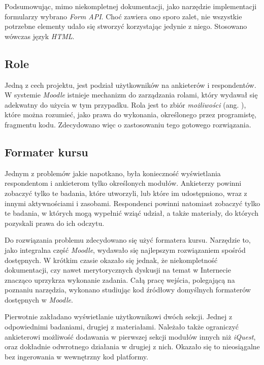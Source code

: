 Podsumowując, mimo niekompletnej dokumentacji, jako narzędzie implementacji formularzy wybrano \textit{Form API}. Choć zawiera ono sporo zalet, nie wszystkie potrzebne elementy udało się stworzyć korzystając jedynie z niego. Stosowano wówczas język \textit{HTML}. 

\subsection{Role}
\label{Chapter626}

Jedną z cech projektu, jest podział użytkowników na ankieterów i respondentów. W systemie \textit{Moodle} istnieje mechanizm do zarządzania rolami, który wydawał się adekwatny do użycia w tym przypadku. Rola jest to zbiór \textit{możliwości} (ang. ), które można rozumieć, jako prawa do wykonania, określonego przez programistę, fragmentu kodu. Zdecydowano więc o zastosowaniu tego gotowego rozwiązania.

\subsection{Formater kursu}
\label{Chapter627}

Jednym z problemów jakie napotkano, była konieczność wyświetlania respondentom i ankieterom tylko określonych modułów. Ankieterzy powinni zobaczyć tylko te badania, które utworzyli, lub które im udostępniono, wraz z innymi aktywnościami i zasobami. Respondenci powinni natomiast zobaczyć tylko te badania, w których mogą wypełnić wziąć udział, a także materiały, do których pozyskali prawa do ich odczytu.

Do rozwiązania problemu zdecydowano się użyć formatera kursu. Narzędzie to, jako integralna część \textit{Moodle}, wydawało się najlepszym rozwiązaniem spośród dostępnych. W krótkim czasie okazało się jednak, że niekompletność dokumentacji, czy nawet merytorycznych dyskusji na temat w Internecie znacząco uprzykrza wykonanie zadania. Całą pracę wejścia, polegającą na poznaniu narzędzia, wykonano studiując kod źródłowy domyślnych formaterów dostępnych w \textit{Moodle}.

Pierwotnie zakładano wyświetlanie użytkownikowi dwóch sekcji. Jednej z odpowiednimi badaniami, drugiej z materiałami. Należało także ograniczyć ankieterowi możliwość dodawania w pierwszej sekcji modułów innych niż \textit{iQuest}, oraz dokładnie odwrotnego działania w drugiej z nich. Okazało się to nieosiągalne bez ingerowania w wewnętrzny kod platformy.

